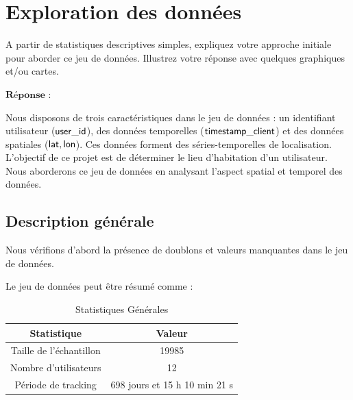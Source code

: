 \documentclass[10pt,a4paper]{article}
\begin{document}
\tableofcontents
\vspace{30mm}
\section{Exploration des données}
A partir de statistiques descriptives simples, expliquez votre approche initiale pour aborder ce jeu de données. Illustrez votre réponse avec quelques graphiques et/ou cartes.

\vspace{5mm}
$\textbf{Réponse : }$

Nous disposons de trois caractéristiques dans le jeu de données : un identifiant utilisateur ($\sf{user\_id}$),
des données temporelles ($\sf{timestamp\_client}$) et des données spatiales ($\sf{lat, lon}$). Ces données forment des séries-temporelles de localisation.
L'objectif de ce projet est de déterminer le lieu d'habitation d'un utilisateur. Nous aborderons
ce jeu de données en analysant l'aspect spatial et temporel des données.

\vspace{5mm}
\subsection{Description générale}

Nous vérifions d'abord la présence de doublons et valeurs manquantes dans le jeu de données.

Le jeu de données peut être résumé comme :


\begin{table}[H]
    \begin{center}
        \begin{tabular}{|c|c|}
            \hline
            Statistique             & Valeur                        \\
            \hline
            Taille de l'échantillon & 19985                         \\
            Nombre d'utilisateurs   & 12                            \\
            Période de tracking     & 698 jours et 15 h 10 min 21 s \\
            \hline
        \end{tabular}
        \caption{\label{tab:table1}Statistiques Générales}
    \end{center}
\end{table}
\end{document}
